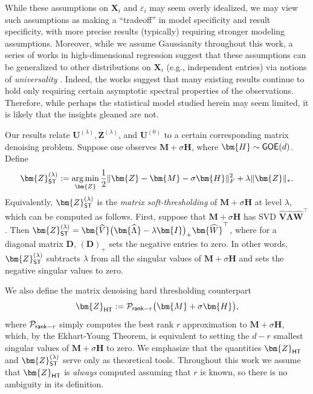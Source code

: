 \documentclass[10pt]{article}
\DeclareMathOperator*{\argmin}{arg\,min}
\newcommand{\eps}{\ensuremath{\varepsilon}}
\renewcommand{\t}{^{\top}}
\renewcommand{\hat}{\widehat}
\theoremstyle{definition}
\begin{document}
While these assumptions on $\bm{X}_i$ and $\eps_i$ may seem overly idealized, we may view such assumptions as making a ``tradeoff'' in model specificity and result specificity, with more precise results (typically) requiring stronger modeling assumptions.  Moreover, while we assume Gaussianity throughout this work, a series of works in high-dimensional regression  suggest that these assumptions can be generalized to other distributions on $\bm{X}_i$ (e.g., independent entries) via notions of \emph{universality} \citep{dudeja_spectral_2024,dudeja_universality_2023,han_entrywise_2024,han_universality_2023,montanari_universality_2023}. 
Indeed, the works \citet{dudeja_spectral_2024,dudeja_universality_2023} suggest that many existing results continue to hold only requiring certain asymptotic spectral properties of the observations.  
Therefore, while perhaps the statistical model studied herein may seem limited, it is likely that the insights gleaned are not. 





Our results relate $\bm{U}^{(\lambda)}, \bm{Z}^{(\lambda)}$, and $\bm{U}^{(0)}$ to a certain corresponding matrix denoising problem.  Suppose one observes $\bm{M} + \sigma \bm{H}$, where  $\bm{H} \sim {{\sf GOE}}(d)$.
Define
\begin{align}
    \bm{Z}_{{\sf ST}}^{(\lambda)} := \argmin_{\bm{Z}} \frac{1}{2} \| \bm{Z} - \bm{M} - \sigma \bm{H} \|_F^2 + \lambda  \| \bm{Z} \|_*.
\end{align}
Equivalently, $\bm{Z}_{{\sf ST}}^{(\lambda)}$ is the \emph{matrix soft-thresholding} of $\bm{M} + \sigma\bm{H}$ at level $\lambda$, which can be computed as follows.  First, suppose that $\bm{M} + \sigma \bm{H}$ has SVD $\bm{\hat V} \bm{\hat \Lambda} \bm{\hat W}\t$.  Then $\bm{Z}_{{\sf ST}}^{(\lambda)} = \bm{\hat V}\big( \bm{\hat \Lambda} - \lambda \bm{I} \big)_+ \bm{\hat W}\t$, where for a diagonal matrix $\bm{D}$, $(\bm{D})_+$ sets the negative entries to zero.  In other words, $\bm{Z}_{{\sf ST}}^{(\lambda)}$ subtracts $\lambda$ from all the singular values of $\bm{M} + \sigma \bm{H}$ and sets the negative singular values to zero.  

 We also define the matrix denoising hard thresholding counterpart
\begin{align}
    \bm{Z}_{{\sf HT}} := \mathcal{P}_{{\sf rank}-r} \big( \bm{M} + \sigma \bm{H} \big),
\end{align}
where $\mathcal{P}_{{\sf rank}-r}$ simply computes the best rank $r$ approximation to $\bm{M} + \sigma \bm{H}$, which, by the Ekhart-Young Theorem, is equivalent to setting the $d-r$ smallest singular values of $\bm{M} + \sigma \bm{H}$ to zero.    We emphasize that  the quantities $\bm{Z}_{{\sf HT}}$ and $\bm{Z}_{{\sf ST}}^{(\lambda)}$ serve only as theoretical tools. Throughout this work we assume that $\bm{Z}_{{\sf HT}}$ is \emph{always} computed assuming that $r$ is known, so there is no ambiguity in its definition.  
\end{document}
